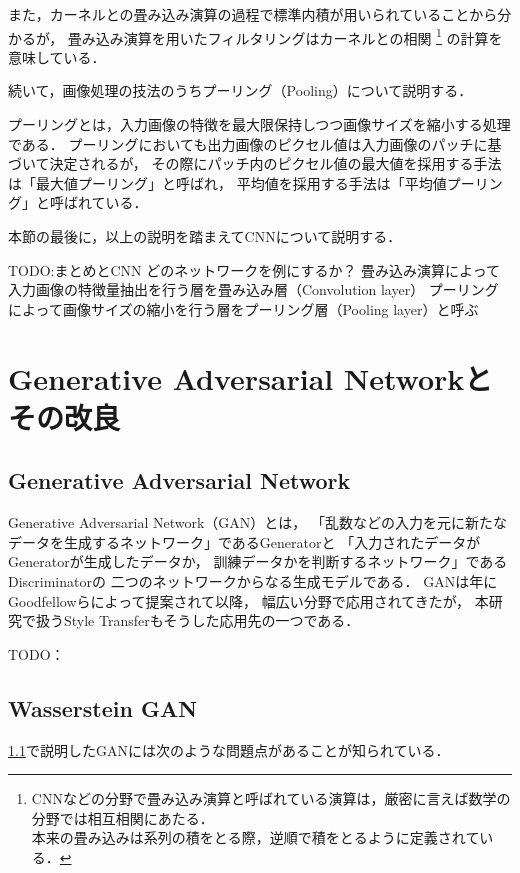 \documentclass[\homedir/main.tex]{subfiles}
\begin{document}
また，カーネルとの畳み込み演算の過程で標準内積が用いられていることから分かるが，
畳み込み演算を用いたフィルタリングはカーネルとの相関
\footnote{
    CNNなどの分野で畳み込み演算と呼ばれている演算は，厳密に言えば数学の分野では相互相関にあたる．\\
    本来の畳み込みは系列の積をとる際，逆順で積をとるように定義されている．
}
の計算を意味している．

続いて，画像処理の技法のうちプーリング（Pooling）について説明する．

プーリングとは，入力画像の特徴を最大限保持しつつ画像サイズを縮小する処理である．
プーリングにおいても出力画像のピクセル値は入力画像のパッチに基づいて決定されるが，
その際にパッチ内のピクセル値の最大値を採用する手法は「最大値プーリング」と呼ばれ，
平均値を採用する手法は「平均値プーリング」と呼ばれている．

本節の最後に，以上の説明を踏まえてCNNについて説明する．

TODO:まとめとCNN
どのネットワークを例にするか？
畳み込み演算によって入力画像の特徴量抽出を行う層を畳み込み層（Convolution layer）
プーリングによって画像サイズの縮小を行う層をプーリング層（Pooling layer）と呼ぶ

\section{Generative Adversarial Networkとその改良}\label{sec:gan_and_its_improvements}
\subsection{Generative Adversarial Network}\label{sec:gan}
Generative Adversarial Network（GAN）とは，
「乱数などの入力を元に新たなデータを生成するネットワーク」であるGeneratorと
「入力されたデータがGeneratorが生成したデータか，
訓練データかを判断するネットワーク」であるDiscriminatorの
二つのネットワークからなる生成モデルである．
GANは\citeyear{NIPS2014_5ca3e9b1}年に
Goodfellowら\cite{NIPS2014_5ca3e9b1}によって提案されて以降，
幅広い分野で応用されてきたが，
本研究で扱うStyle Transferもそうした応用先の一つである．


TODO：



\subsection{Wasserstein GAN}\label{sec:wgan}
\cref{sec:gan}で説明したGANには次のような問題点があることが知られている．
\end{document}
